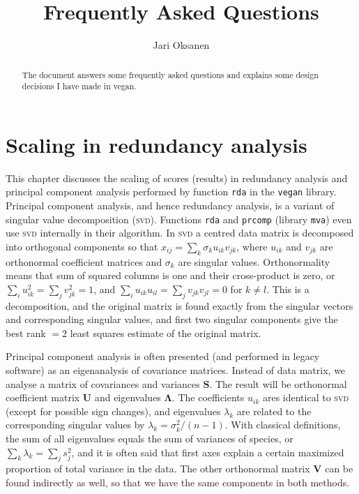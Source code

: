 \documentclass[a4paper]{article}
\author{Jari Oksanen}
\title{Frequently Asked Questions}
\begin{document}
\maketitle

\begin{abstract}

\noindent 
The document answers some frequently asked questions and explains some
design decisions I have made in vegan.  

\end{abstract}

\tableofcontents

\section{Scaling in redundancy analysis}

This chapter discusses the scaling of scores (results) in redundancy
analysis and principal component analysis performed by function
\texttt{rda} in the \texttt{vegan} library.  Principal component
analysis, and hence redundancy analysis, is a variant of singular
value decomposition (\textsc{svd}).  Functions \texttt{rda} and
\texttt{prcomp} (library \texttt{mva}) even use \textsc{svd}
internally in their algorithm.  In \textsc{svd} a centred data matrix
is decomposed into orthogonal components so that $x_{ij} = \sum_k
\sigma_k u_{ik} v_{jk}$, where $u_{ik}$ and $v_{jk}$ are orthonormal
coefficient matrices and $\sigma_k$ are singular values.
Orthonormality means that sum of squared columns is one and their
cross-product is zero, or $\sum_i u_{ik}^2 = \sum_j v_{jk}^2 = 1$, and
$\sum_i u_{ik} u_{il} = \sum_j v_{jk} v_{jl} = 0$ for $k \neq l$. This
is a decomposition, and the original matrix is found exactly from the
singular vectors and corresponding singular values, and first two
singular components give the best rank $=2$ least squares estimate of
the original matrix.

Principal component analysis is often presented (and performed in
legacy software) as an eigenanalysis of covariance matrices.  Instead
of data matrix, we analyse a matrix of covariances and variances
$\mathbf{S}$.  The result will be orthonormal coefficient matrix
$\mathbf{U}$ and eigenvalues $\mathbf{\Lambda}$.  The coefficients
$u_{ik}$ ares identical to \textsc{svd} (except for possible sign
changes), and eigenvalues $\lambda_k$ are related to the corresponding
singular values by $\lambda_k = \sigma_k^2 /(n-1)$.  With classical
definitions, the sum of all eigenvalues equals the sum of variances of
species, or $\sum_k \lambda_k = \sum_j s_j^2$, and it is often said
that first axes explain a certain maximized proportion of total
variance in the data.  The other orthonormal matrix $\mathbf{V}$ can
be found indirectly as well, so that we have the same components in
both methods.
\end{document}
